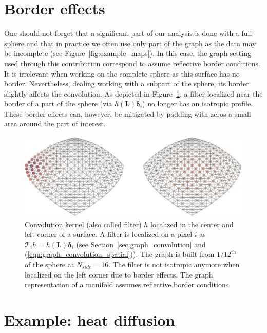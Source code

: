 \documentclass[final,twocolumn,3p,times,sort&compress]{elsarticle}
\newcommand{\figref}[1]{Figure~\ref{fig:#1}}
\newcommand{\secref}[1]{Section~\ref{sec:#1}}
\newcommand{\eqnref}[1]{(\ref{eqn:#1})}
\renewcommand{\b}[1]{{\bm{#1}}}   %
\newcommand{\1}{\b{1}}              %
\newcommand{\0}{\b{0}}              %
\renewcommand{\L}{\b{L}}
\newcommand{\T}{\mathcal{T}}
\begin{document}
\section{Border effects}
\label{sec:border_effects}

One should not forget that a significant part of our analysis is done with a full sphere and that in practice we often use only part of the graph as the data may be incomplete (see \figref{example_maps}).
In this case, the graph setting used through this contribution correspond to assume reflective border conditions.
It is irrelevant when working on the complete sphere as this surface has no border. Nevertheless, dealing working with a subpart of the sphere, its border slightly affects the convolution.
As depicted in \figref{border_effects}, a filter localized near the border of a part of the sphere (via $h(\L) \b \delta_i$) no longer has an isotropic profile.
These border effects can, however, be mitigated by padding with zeros a small area around the part of interest.

\begin{figure}[ht!]
	\centering
	\includegraphics[width=\linewidth]{border_effects}
	\caption{Convolution kernel (also called filter) $h$ localized in the center and left corner of a surface. A filter is localized on a pixel $i$ as $\T_i h = h(\L) \b \delta_i$ (see \secref{graph_convolution} and \eqnref{graph_convolution_spatial}). The graph is built from $1/12^\text{th}$ of the sphere at $N_{side} = 16$. The filter is not isotropic anymore when localized on the left corner due to border effects. The graph representation of a manifold assumes reflective border conditions.}
	\label{fig:border_effects}
\end{figure}

\section{Example: heat diffusion}
\label{sec:heat_diffusion}
\label{sec:filter_visualization}
\end{document}
